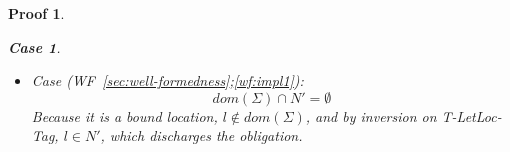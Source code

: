\documentclass[showabstract,showacknowledgments,showpreface,showdedication,school]{iuphd}
\newtheorem*{bcase}{Case}
\theoremstyle{nonumberplain}
\newtheorem{nproof}{Proof}
\newcommand{\keywd}[1]{\mathit{#1}}
\newcommand{\skeywd}[1]{\mathit{#1}}
\newcommand{\DC}{\keywd{K}}
\newcommand{\loc}{\skeywd{l}}
\newcommand{\concreteloc}[3]{\ensuremath{\langle #1, #2 \rangle ^{#3}}}
\newcommand{\reg}{\skeywd{r}}
\newcommand{\ind}{\keywd{i}}
\newcommand{\STOR}{\keywd{S}}
\newcommand{\SENV}{\keywd{\Sigma}}
\newcommand{\MENV}{\keywd{M}}
\newcommand{\AENV}{\keywd{A}}
\newcommand{\NENV}{\keywd{N}}
\newcommand{\locreg}[2]{\ensuremath{{#1}^{#2}}}
\newcommand{\allocptr}[2]{\keywd{MaxIdx}(#1,#2)}
\newcommand{\refwellformed}[2]{WF~\ref{#1};\ref{#2}}
\newcommand{\dletloctag}{D-LetLoc-Tag}
\newcommand{\tlltag}{T-LetLoc-Tag}
\begin{document}
\begin{nproof}
\begin{bcase}
\begin{itemize}
\begin{itemize}
\begin{itemize}
        \item Case (\refwellformed{sec:well-formedness-allocation}{wf:impl-linear-alloc2}):
        This obligation discharges immediately because, by inversion on \tlltag{}, $\locreg{\loc}{\reg} \in \NENV'$.
        \item Case (\refwellformed{sec:well-formedness-allocation}{wf:impl-write-once}):
        The proof obligation is to establish that, for any constructor tag $\DC$,
        \begin{align*}
         ((\locreg{\loc}{\reg} \mapsto \concreteloc{\reg}{\ind+1}{}) \in \MENV' \wedge \\
          (\reg \mapsto (\ind+1 \mapsto \DC)) \not \in \STOR)
        \end{align*}
        The first conjunct discharges by inversion on \dletloctag{},
        and the second as a consequence of having already
        established just above that $\ind+1 > \allocptr{\reg}{\STOR}$.
        \item Case (\refwellformed{sec:well-formedness-allocation}{wf:impl-empty-region}):
        The proof obligation is to establish that, for each
        $(\reg \mapsto \emptyset) \in \AENV'$, it is the case that
        $\reg \not \in dom(\STOR)$.
        This case discharges because, from the premise of the
        lemma, this property holds for the original environment
        $\AENV$ and store $\STOR$, and, by inversion on \tlltag{},
        continues to hold for $\AENV'$ and $\STOR'$.
      \end{itemize}
      \item
      Case (\refwellformed{sec:well-formedness}{wf:impl1}):
      \begin{displaymath}
      dom(\SENV) \cap \NENV' = \emptyset
      \end{displaymath}
      Because it is a bound location, $\loc \not \in dom(\SENV)$, and by inversion on \tlltag{},
      $\loc \in \NENV'$, which discharges the obligation.
      \end{itemize}
    \end{itemize}
  \end{bcase}


\end{nproof}
\end{document}
